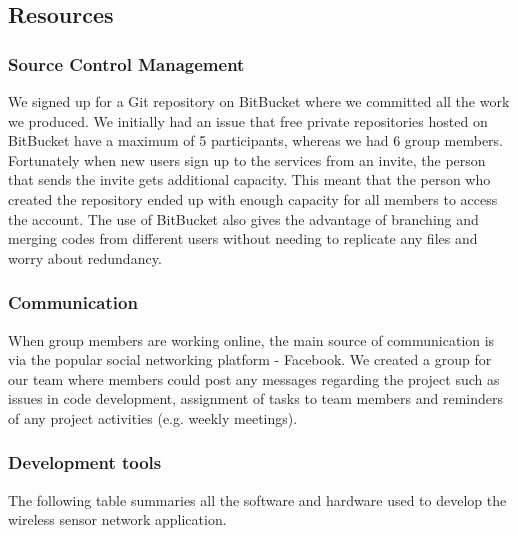 \subsection{Resources}

\subsubsection{Source Control Management}

We signed up for a Git repository on BitBucket \cite{bitbucket} where we committed all the work we produced. We initially had an issue that free private repositories hosted on BitBucket have a maximum of 5 participants, whereas we had 6 group members. Fortunately when new users sign up to the services from an invite, the person that sends the invite gets additional capacity. This meant that the person who created the repository ended up with enough capacity for all members to access the account. The use of BitBucket also gives the advantage of branching and merging codes from different users without needing to replicate any files and worry about redundancy. 

\subsubsection{Communication}

When group members are working online, the main source of communication is via the popular social networking platform - Facebook. We created a group for our team where members could post any messages regarding the project such as issues in code development, assignment of tasks to team members and reminders of any project activities (e.g. weekly meetings).

\subsubsection{Development tools}

The following table summaries all the software and hardware used to develop the wireless sensor network application. 


